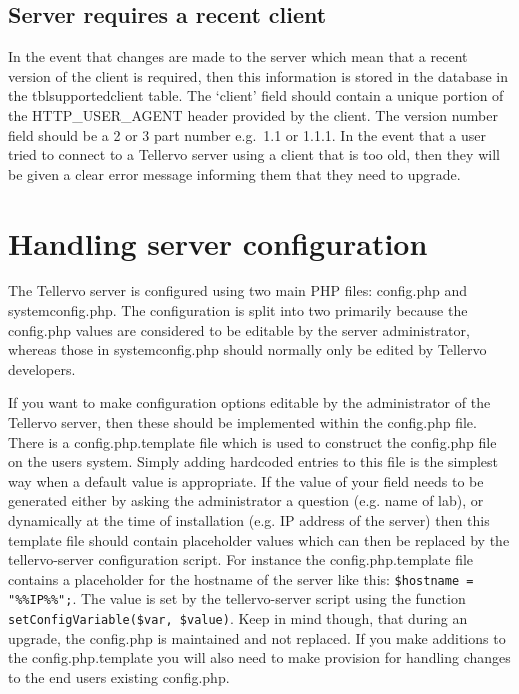 \subsection{Server requires a recent client}

In the event that changes are made to the server which mean that a recent version of the client is required, then this information is stored in the database in the tblsupportedclient table.  The `client' field should contain a unique portion of the HTTP\_USER\_AGENT header provided by the client.  The version number field should be a 2 or 3 part number e.g.\ 1.1 or 1.1.1.  In the event that a user tried to connect to a Tellervo server using a client that is too old, then they will be given a clear error message informing them that they need to upgrade.


\section{Handling server configuration}
The Tellervo server is configured using two main PHP files: config.php and systemconfig.php.  The configuration is split into two primarily because the config.php values are considered to be editable by the server administrator, whereas those in systemconfig.php should normally only be edited by Tellervo developers.  

If you want to make configuration options editable by the administrator of the Tellervo server, then these should be implemented within the config.php file.  There is a config.php.template file which is used to construct the config.php file on the users system.  Simply adding hardcoded entries to this file is the simplest way when a default value is appropriate.  If the value of your field needs to be generated either by asking the administrator a question (e.g. name of lab), or dynamically at the time of installation (e.g. IP address of the server) then this template file should contain placeholder values which can then be replaced by the tellervo-server configuration script.  For instance the config.php.template file contains a placeholder for the hostname of the server like this: \verb|$hostname = "%%IP%%";|.  The value is set by the tellervo-server script using the function \verb|setConfigVariable($var, $value)|.  Keep in mind though, that during an upgrade, the config.php is maintained and not replaced.  If you make additions to the config.php.template you will also need to make provision for handling changes to the end users existing config.php.

